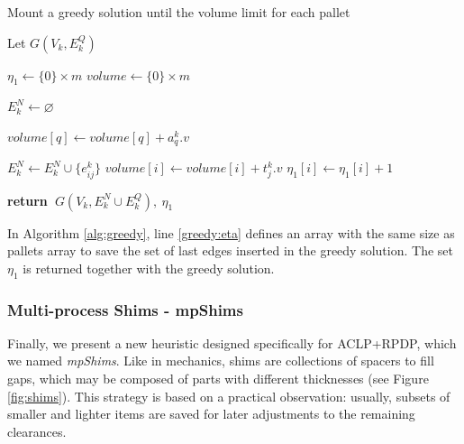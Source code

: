 \documentclass[preprint,authoryear]{elsarticle}
\renewcommand{\Return}{\State \bf {return}~}
\begin{document}
\begin{algorithm}[H]
	\caption{Mount a greedy solution until the volume limit for each pallet}  \label{alg:greedy}
	
	\begin{algorithmic}[1]
		
		
		\State Let $G(V_k, E^Q_k)$
		
		\State $\eta_1 \gets \{0\} \times m$ \label{greedy:eta}
		\State $volume \gets \{0\} \times m$
		
		\State $E^N_k \gets \varnothing$ 			
		
				\State $volume[q] \gets volume[q] + a_q^k.v$ 
			\EndIf		
		\EndFor
			
				\State $E^N_k \gets E^N_k \cup \{e_{ij}^k\}$ 
				\State $volume[i] \gets volume[i] + t_j^k.v$
				\State $\eta_1[i] \gets \eta_1[i] + 1$ 	
			\EndIf
		\EndFor
		
		\Return $G(V_k, E^N_k \cup E^Q_k),\ \eta_1$ 
		
		\EndProcedure
		
	\end{algorithmic}
\end{algorithm}

In Algorithm \ref{alg:greedy}, line \ref{greedy:eta} defines an array with the same size as pallets array to save the set of last edges inserted in the greedy solution. The set $\eta_1$ is returned together with the greedy solution.


\subsubsection{Multi-process Shims - mpShims}


Finally, we present a new heuristic designed specifically for ACLP+RPDP, which we named \emph{mpShims}. Like in mechanics, shims are collections of spacers to fill gaps, which may be composed of parts with different thicknesses (see Figure \ref{fig:shims}). This strategy is based on a practical observation: usually, subsets of smaller and lighter items are saved for later adjustments to the remaining clearances.
\end{document}
